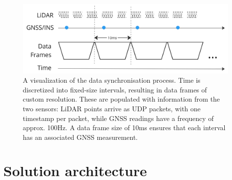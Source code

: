 \begin{figure}
    \centering
    \includegraphics[width=0.7\linewidth]{images/data_sync.jpg}
    \caption[Data frame synchronisation]{A visualization of the data synchronisation process. Time is discretized into fixed-size intervals, resulting in data frames of custom resolution. These are populated with information from the two sensors: LiDAR points arrive as UDP packets, with one timestamp per packet, while GNSS readings have a frequency of approx. 100Hz. A data frame size of 10ms ensures that each interval has an associated GNSS measurement.}
    \label{fig:data-sync}
\end{figure}







\section{Solution architecture}






